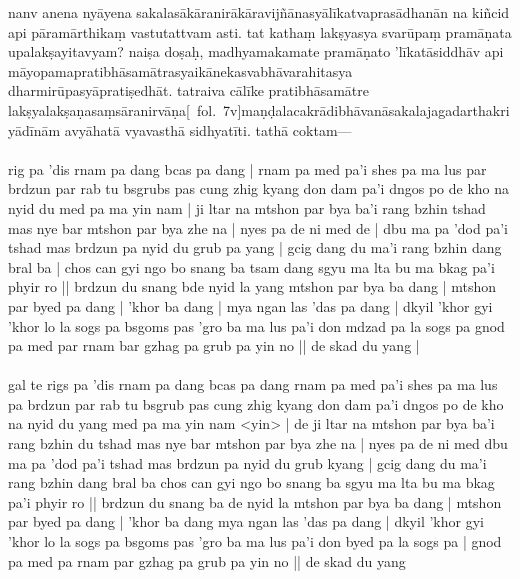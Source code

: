 \documentclass[12pt]{article}
\newcommand{\emdash} {\hspace{0em}—\hspace{0em}}
\begin{document}
nanv anena nyāyena sakalasākāranirākāravijñānasyālīkatvaprasādhanān na kiñcid api pāramārthikaṃ vastutattvam asti.\footnoteB{
	asti] \conj ; astīti \MS\ \EDD\ (astīti?) (\emph{iti} has no reflex in \TIB)
} tat kathaṃ lakṣyasya svarūpaṃ pramāṇata upalakṣayitavyam? naiṣa doṣaḥ, madhyamakamate pramāṇato 'līkatāsiddhāv api māyopamapratibhāsamātrasyaikānekasvabhāvarahitasya dharmirūpasyāpratiṣedhāt. tatraiva cālīke pratibhāsamātre lakṣyalakṣaṇasaṃsāranirvāṇa[\MS\ fol.\ 7v]maṇḍalacakrādibhāvanāsakalajagadarthakriyādīnām\footnoteB{
	°bhāvanā°] \MS ; °bhāvanā \EDD\ (variant word division); bsgoms pas \TIB\ (bhāvanayā)
} avyāhatā vyavasthā\footnoteB{
	vyavasthā] \MS ; vyavasthā ca \EDD\ (\emd)
} sidhyatīti. tathā coktam\emdash \\

\textbf{\TVA}\\
rig pa 'dis rnam pa dang bcas pa dang | rnam pa med pa'i shes pa ma lus par brdzun par rab tu bsgrubs pas cung zhig kyang don dam pa'i dngos po de kho na nyid du med pa ma yin nam | ji ltar na mtshon par bya ba'i rang bzhin tshad mas nye bar mtshon par bya zhe na | nyes pa de ni med de | dbu ma pa 'dod pa'i tshad mas brdzun pa nyid du grub pa yang | gcig dang du ma'i rang bzhin dang bral ba | chos can gyi ngo bo snang ba tsam dang sgyu ma lta bu ma bkag pa'i phyir ro || brdzun du snang bde nyid la yang mtshon par bya ba dang | mtshon par byed pa dang | 'khor ba dang | mya ngan las 'das pa dang | dkyil 'khor gyi 'khor lo la sogs pa bsgoms pas 'gro ba ma lus pa'i don mdzad pa la sogs pa gnod pa med par rnam bar gzhag pa grub pa yin no || de skad du yang | \\

\textbf{\TVB}\\
gal te rigs pa 'dis rnam pa dang bcas pa dang rnam pa med pa'i shes pa ma lus pa brdzun par rab tu bsgrub pas cung zhig kyang don dam pa'i dngos po de kho na nyid du yang med pa ma yin nam <yin> | de ji ltar na mtshon par bya ba'i rang bzhin du tshad mas nye bar mtshon par bya zhe na | nyes pa de ni med dbu ma pa 'dod pa'i tshad mas brdzun pa nyid du grub kyang | gcig dang du ma'i rang bzhin dang bral ba chos can gyi ngo bo snang ba sgyu ma lta bu ma bkag pa'i phyir ro || brdzun du snang ba de nyid la mtshon par bya ba dang | mtshon par byed pa dang | 'khor ba dang mya ngan las 'das pa dang | dkyil 'khor gyi 'khor lo la sogs pa bsgoms pas 'gro ba ma lus pa'i don byed pa la sogs pa | gnod pa med pa rnam par gzhag pa grub pa yin no || de skad du yang 
\end{document}
